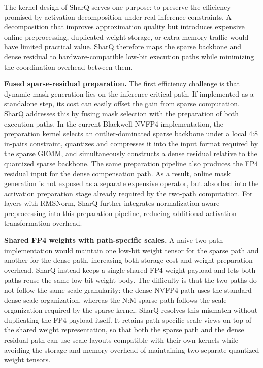 \documentclass{article}
\begin{document}
The kernel design of SharQ serves one purpose: to preserve the efficiency
promised by activation decomposition under real inference constraints. A
decomposition that improves approximation quality but introduces expensive online
preprocessing, duplicated weight storage, or extra memory traffic would have
limited practical value. SharQ therefore maps the sparse backbone and dense
residual to hardware-compatible low-bit execution paths while minimizing the
coordination overhead between them.

\textbf{Fused sparse-residual preparation.}
The first efficiency challenge is that dynamic mask generation lies on the
inference critical path. If implemented as a standalone step, its cost can
easily offset the gain from sparse computation. SharQ addresses this by fusing
mask selection with the preparation of both execution paths. In the current
Blackwell NVFP4 implementation, the preparation kernel selects an
outlier-dominated sparse backbone under a local 4:8 in-pairs constraint,
quantizes and compresses it into the input format required by the sparse GEMM,
and simultaneously constructs a dense residual relative to the quantized sparse
backbone. The same preparation pipeline also produces the FP4 residual input for
the dense compensation path. As a result, online mask generation is not exposed
as a separate expensive operator, but absorbed into the activation preparation
stage already required by the two-path computation. For layers with RMSNorm,
SharQ further integrates normalization-aware preprocessing into this
preparation pipeline, reducing additional activation transformation overhead.

\textbf{Shared FP4 weights with path-specific scales.}
A naive two-path implementation would maintain one low-bit weight tensor for the
sparse path and another for the dense path, increasing both storage cost and
weight preparation overhead. SharQ instead keeps a single shared FP4 weight
payload and lets both paths reuse the same low-bit weight body. The difficulty is
that the two paths do not follow the same scale granularity: the dense NVFP4
path uses the standard dense scale organization, whereas the N:M sparse path
follows the scale organization required by the sparse kernel. SharQ resolves this
mismatch without duplicating the FP4 payload itself. It retains path-specific
scale views on top of the shared weight representation, so that both the sparse
path and the dense residual path can use scale layouts compatible with their own
kernels while avoiding the storage and memory overhead of maintaining two
separate quantized weight tensors.
\end{document}
